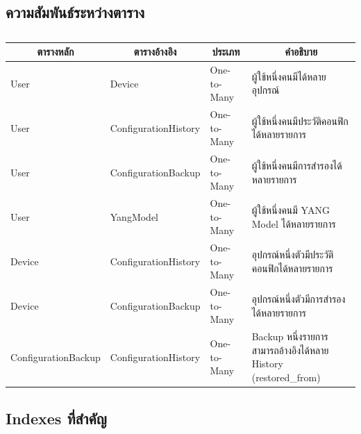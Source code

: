 
\subsection{ความสัมพันธ์ระหว่างตาราง}

\begin{table}[H]
    \caption{}
    \label{tab:table-relationships}
    \fontSixTeen 
    \begin{tabularx}{\textwidth}{|l|l|l|X|} 
        \hline
        \multicolumn{1}{|c|}{\textbf{ตารางหลัก}} & \multicolumn{1}{c|}{\textbf{ตารางอ้างอิง}} & \multicolumn{1}{c|}{\textbf{ประเภท}} & \multicolumn{1}{c|}{\textbf{คำอธิบาย}} \\
        \hline
        User & Device & One-to-Many & ผู้ใช้หนึ่งคนมีได้หลายอุปกรณ์ \\
        \hline
        User & ConfigurationHistory & One-to-Many & ผู้ใช้หนึ่งคนมีประวัติคอนฟิกได้หลายรายการ \\
        \hline
        User & ConfigurationBackup & One-to-Many & ผู้ใช้หนึ่งคนมีการสำรองได้หลายรายการ \\
        \hline
        User & YangModel & One-to-Many & ผู้ใช้หนึ่งคนมี YANG Model ได้หลายรายการ \\
        \hline
        Device & ConfigurationHistory & One-to-Many & อุปกรณ์หนึ่งตัวมีประวัติคอนฟิกได้หลายรายการ \\
        \hline
        Device & ConfigurationBackup & One-to-Many & อุปกรณ์หนึ่งตัวมีการสำรองได้หลายรายการ \\
        \hline
        ConfigurationBackup & ConfigurationHistory & One-to-Many & Backup หนึ่งรายการสามารถอ้างอิงได้หลาย History (restored\_from) \\
        \hline
    \end{tabularx}
\end{table}

\subsection{Indexes ที่สำคัญ}

